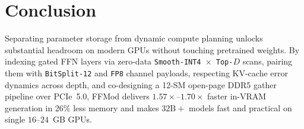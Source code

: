 \documentclass[10pt,twocolumn]{article}
\begin{document}
\section{Conclusion}
Separating parameter storage from dynamic compute planning unlocks substantial headroom on modern GPUs without touching pretrained weights. By indexing gated FFN layers via zero-data \texttt{Smooth-INT4 $\times$ Top-$D$} scans, pairing them with \texttt{BitSplit-12} and \texttt{FP8} channel payloads, respecting KV-cache error dynamics across depth, and co-designing a 12-SM open-page DDR5 gather pipeline over PCIe~5.0, FFMod delivers $1.57\times\text{--}1.70\times$ faster in-VRAM generation in $26\%$ less memory and makes $32\text{B}+$ models fast and practical on single $16\text{--}24$~GB GPUs.



\end{document}
